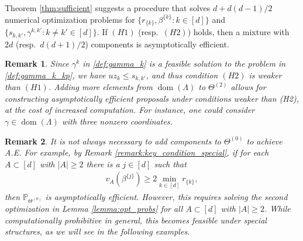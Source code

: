 \documentclass[aap,preprint]{imsart}
\newcommand{\Pro}{{\mathbb{P}}}
\theoremstyle{plain}
\newtheorem{remark}{Remark}[section]
\theoremstyle{definition}
\begin{document}
Theorem
\ref{thm:sufficient}  suggests a procedure that solves $d+d(d-1)/2$ numerical optimization problems for $\{ r_{\{k\}}, \beta^{\{k\}}: k \in [d]\}$ and $\{s_{k,k'}, \gamma^{k,k'}: k \neq k' \in [d]\}$. If $(H1)$ (resp.~$(H2)$) holds, then a mixture with  $2d$ (resp.~$d(d+1)/2$) components is asymptotically efficient. %


\begin{remark}
Since $\gamma^k$ in \eqref{def:gamma_k} is a feasible solution to the problem in \eqref{def:gamma_k_kp}, we have $u z_k \leq s_{k,k'}$, and thus condition $(H2)$ is weaker than $(H1)$. Adding more elements from $\operatorname{dom}(\Lambda)$ to $\Theta^{(2)}$ allows for constructing asymptotically efficient proposals under conditions weaker than (H2), at the cost of increased computation. For instance, one could consider  $\gamma \in \operatorname{dom}(\Lambda)$ with \textit{three} nonzero coordinates.
\end{remark}



\begin{remark}\label{remark:general_sufficient_condition}
It is not always necessary to add components to $\Theta^{(0)}$ to achieve A.E. %
For example, by Remark \ref{remark:key_condition_special},
if for each $A \subset [d]$ with $|A| \geq 2$ there is a  $j \in [d]$ such that
\begin{align}\label{def:general_sufficient_condition}
    v_A(\beta^{\{j\}})\geq 2\min_{k \in [d]} r_{\{k\}},
\end{align}
then   $\Pro_{\Theta^{(0)}}$ is asymptotically efficient. However, this requires solving the second optimization in Lemma \ref{lemma:opt_probs} for all $A \subset [d]$ with $|A| \geq 2$. While computationally prohibitive in general, this becomes feasible under special structures, as we will see in the following examples.
\end{remark}
\end{document}
